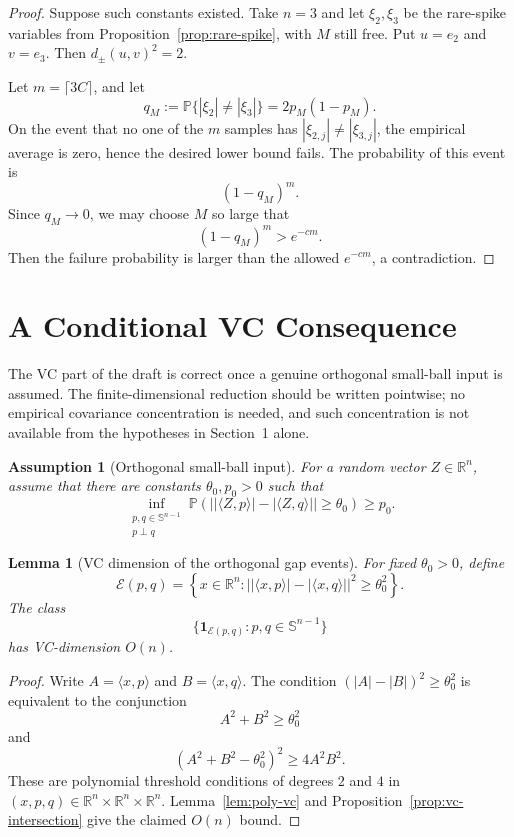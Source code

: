 \documentclass[11pt]{amsart}
\numberwithin{equation}{section}
\newtheorem{lemma}[theorem]{Lemma}
\newtheorem{assumption}[theorem]{Assumption}
\theoremstyle{definition}
\theoremstyle{remark}
\newcommand{\Prob}{\mathbb P}
\newcommand{\R}{\mathbb R}
\newcommand{\Sph}{\mathbb S}
\newcommand{\distpm}[2]{d_{\pm}(#1,#2)}
\begin{document}
\begin{proof}
Suppose such constants existed.  Take \(n=3\) and let \(\xi_2,\xi_3\) be the
rare-spike variables from Proposition~\ref{prop:rare-spike}, with \(M\) still
free.  Put \(u=e_2\) and \(v=e_3\).  Then \(\distpm{u}{v}^2=2\).

Let \(m=\lceil 3C\rceil\), and let
\[
q_M:=\Prob\{|\xi_2|\ne|\xi_3|\}=2p_M(1-p_M).
\]
On the event that no one of the \(m\) samples has
\(|\xi_{2,j}|\ne|\xi_{3,j}|\), the empirical average is zero, hence the desired
lower bound fails.  The probability of this event is
\[
        (1-q_M)^m.
\]
Since \(q_M\to0\), we may choose \(M\) so large that
\[
        (1-q_M)^m>e^{-cm}.
\]
Then the failure probability is larger than the allowed \(e^{-cm}\), a
contradiction.
\end{proof}

\section{A Conditional VC Consequence}

The VC part of the draft is correct once a genuine orthogonal small-ball input
is assumed.  The finite-dimensional reduction should be written pointwise; no
empirical covariance concentration is needed, and such concentration is not
available from the hypotheses in Section~1 alone.

\begin{assumption}[Orthogonal small-ball input]\label{ass:orth-small-ball}
For a random vector \(Z\in\R^n\), assume that there are constants
\(\theta_0,p_0>0\) such that
\[
\inf_{\substack{p,q\in\Sph^{n-1}\\ p\perp q}}
\Prob\left(
  \bigl||\langle Z,p\rangle|-|\langle Z,q\rangle|\bigr|\ge\theta_0
\right)\ge p_0 .
\]
\end{assumption}

\begin{lemma}[VC dimension of the orthogonal gap events]\label{lem:gap-vc}
For fixed \(\theta_0>0\), define
\[
\mathcal E(p,q)
=
\left\{
x\in\R^n:
\bigl||\langle x,p\rangle|-|\langle x,q\rangle|\bigr|^2
\ge \theta_0^2
\right\}.
\]
The class
\[
        \{\mathbf 1_{\mathcal E(p,q)}:p,q\in\Sph^{n-1}\}
\]
has VC-dimension \(O(n)\).
\end{lemma}

\begin{proof}
Write \(A=\langle x,p\rangle\) and \(B=\langle x,q\rangle\).  The condition
\((|A|-|B|)^2\ge\theta_0^2\) is equivalent to the conjunction
\[
        A^2+B^2\ge\theta_0^2
\]
and
\[
        (A^2+B^2-\theta_0^2)^2\ge 4A^2B^2.
\]
These are polynomial threshold conditions of degrees \(2\) and \(4\) in
\((x,p,q)\in\R^n\times\R^n\times\R^n\).  Lemma~\ref{lem:poly-vc} and
Proposition~\ref{prop:vc-intersection} give the claimed \(O(n)\) bound.
\end{proof}
\end{document}
